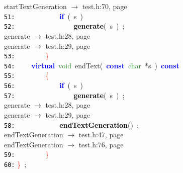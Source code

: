 \documentclass{article}
\begin{document}
\mbox{}{\hfill startTextGeneration $\rightarrow$ test.h:70, page~\pageref{test.h:70}} \\
\mbox{}\texttt{\textcolor{Black}{51:}} \ \ \ \ \ \ \ \ \ \ \ \ \textbf{\textcolor{Blue}{if}}\ \textcolor{BrickRed}{(}\ s\ \textcolor{BrickRed}{)} \\
\mbox{}\texttt{\textcolor{Black}{52:}} \ \ \ \ \ \ \ \ \ \ \ \ \ \ \ \ \textbf{\textcolor{Black}{generate}}\textcolor{BrickRed}{(}\ s\ \textcolor{BrickRed}{)}\ \textcolor{BrickRed}{;} \\
\mbox{}{\hfill generate $\rightarrow$ test.h:28, page~\pageref{test.h:28}} \\
\mbox{}{\hfill generate $\rightarrow$ test.h:29, page~\pageref{test.h:29}} \\
\mbox{}\texttt{\textcolor{Black}{53:}} \ \ \ \ \ \ \ \ \textcolor{Red}{\}} \\
\mbox{}\texttt{\textcolor{Black}{54:}} \ \ \ \ \textbf{\textcolor{Blue}{virtual}}\ \textcolor{ForestGreen}{void}\ \label{test.h:54}endText\textcolor{BrickRed}{(}\ \textbf{\textcolor{Blue}{const}}\ \textcolor{ForestGreen}{char}\ \textcolor{BrickRed}{*}s\ \textcolor{BrickRed}{)}\ \textbf{\textcolor{Blue}{const}} \\
\mbox{}\texttt{\textcolor{Black}{55:}} \ \ \ \ \ \ \ \ \textcolor{Red}{\{} \\
\mbox{}\texttt{\textcolor{Black}{56:}} \ \ \ \ \ \ \ \ \ \ \ \ \textbf{\textcolor{Blue}{if}}\ \textcolor{BrickRed}{(}\ s\ \textcolor{BrickRed}{)} \\
\mbox{}\texttt{\textcolor{Black}{57:}} \ \ \ \ \ \ \ \ \ \ \ \ \ \ \ \ \textbf{\textcolor{Black}{generate}}\textcolor{BrickRed}{(}\ s\ \textcolor{BrickRed}{)}\ \textcolor{BrickRed}{;} \\
\mbox{}{\hfill generate $\rightarrow$ test.h:28, page~\pageref{test.h:28}} \\
\mbox{}{\hfill generate $\rightarrow$ test.h:29, page~\pageref{test.h:29}} \\
\mbox{}\texttt{\textcolor{Black}{58:}} \ \ \ \ \ \ \ \ \ \ \ \ \textbf{\textcolor{Black}{endTextGeneration}}\textcolor{BrickRed}{()}\ \textcolor{BrickRed}{;} \\
\mbox{}{\hfill endTextGeneration $\rightarrow$ test.h:47, page~\pageref{test.h:47}} \\
\mbox{}{\hfill endTextGeneration $\rightarrow$ test.h:76, page~\pageref{test.h:76}} \\
\mbox{}\texttt{\textcolor{Black}{59:}} \ \ \ \ \ \ \ \ \textcolor{Red}{\}} \\
\mbox{}\texttt{\textcolor{Black}{60:}} \textcolor{Red}{\}}\ \textcolor{BrickRed}{;} \\
\end{document}
